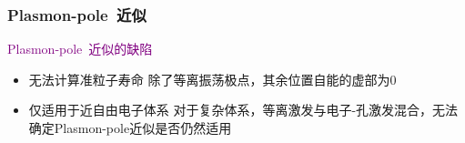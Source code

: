 \documentclass[cjk,slidestop,compress,mathserif,blue]{beamer}
\begin{document}
\frame
{
	\frametitle{\textrm{Plasmon-pole~}近似}
	\textcolor{purple}{\textrm{Plasmon-pole~}近似的缺陷}
	\begin{itemize}
		\item 无法计算准粒子寿命
			除了等离振荡极点，其余位置自能的虚部为$0$
		\item 仅适用于近自由电子体系
			对于复杂体系，等离激发与电子-孔激发混合，无法确定\textrm{Plasmon-pole}近似是否仍然适用
	\end{itemize}
}

\end{document}
